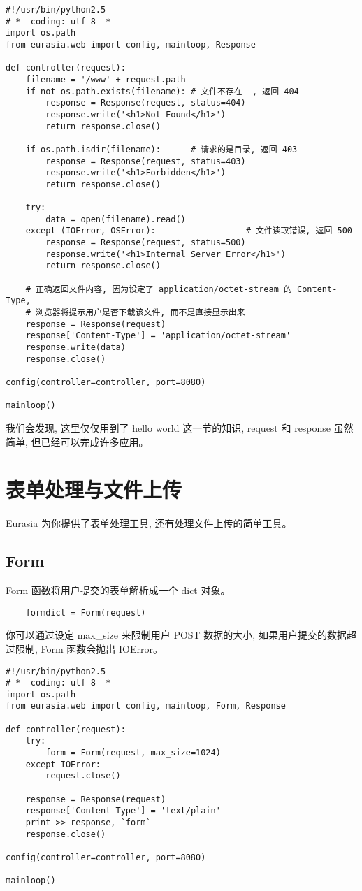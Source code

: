 \documentclass{manual}
\begin{document}
\begin{verbatim}
#!/usr/bin/python2.5
#-*- coding: utf-8 -*-
import os.path
from eurasia.web import config, mainloop, Response

def controller(request):
	filename = '/www' + request.path
	if not os.path.exists(filename): # 文件不存在  , 返回 404
		response = Response(request, status=404)
		response.write('<h1>Not Found</h1>')
		return response.close()

	if os.path.isdir(filename):      # 请求的是目录, 返回 403
		response = Response(request, status=403)
		response.write('<h1>Forbidden</h1>')
		return response.close()

	try:
		data = open(filename).read()
	except (IOError, OSError):                  # 文件读取错误, 返回 500
		response = Response(request, status=500)
		response.write('<h1>Internal Server Error</h1>')
		return response.close()

	# 正确返回文件内容, 因为设定了 application/octet-stream 的 Content-Type,
	# 浏览器将提示用户是否下载该文件, 而不是直接显示出来
	response = Response(request)
	response['Content-Type'] = 'application/octet-stream'
	response.write(data)
	response.close()

config(controller=controller, port=8080)

mainloop()
\end{verbatim}

我们会发现, 这里仅仅用到了 hello world 这一节的知识, request 和 response 虽然简单, 但已经可以完成许多应用。

\section{表单处理与文件上传}

Eurasia 为你提供了表单处理工具, 还有处理文件上传的简单工具。

\subsection{Form}

Form 函数将用户提交的表单解析成一个 dict 对象。

\begin{verbatim}
	formdict = Form(request)
\end{verbatim}

你可以通过设定 max_size 来限制用户 POST 数据的大小, 如果用户提交的数据超过限制, Form 函数会抛出 IOError。

\begin{verbatim}
#!/usr/bin/python2.5
#-*- coding: utf-8 -*-
import os.path
from eurasia.web import config, mainloop, Form, Response

def controller(request):
	try:
		form = Form(request, max_size=1024)
	except IOError:
		request.close()

	response = Response(request)
	response['Content-Type'] = 'text/plain'
	print >> response, `form`
	response.close()

config(controller=controller, port=8080)

mainloop()
\end{verbatim}
\end{document}
